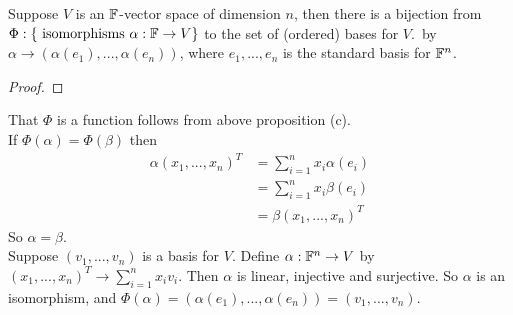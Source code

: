 \documentclass[a4paper]{article}
\begin{document}
\begin{prop}
Suppose $V$ is an $\mathbb{F}$-vector space of dimension $n$, then there is a bijection from $\Phi:\left\{\text{ isomorphisms }\alpha: \mathbb{F} \to V\right\}$ to the set of (ordered) bases for $V$.\ by $\alpha \to \left(\alpha\left(e_1\right),...,\alpha\left(e_n\right)\right)$, where $e_1,...,e_n$ is the standard basis for $\mathbb{F}^n$.
\begin{proof}
\end{proof}
That $\Phi$ is a function follows from above proposition (c).\\
If $\Phi\left(\alpha\right) = \Phi\left(\beta\right)$ then
\begin{equation*}
\begin{aligned}
\alpha \left(x_1,...,x_n\right)^T &= \sum_{i=1}^n x_i \alpha\left(e_i\right)\\
&= \sum_{i=1}^n x_i \beta\left(e_i\right)\\
&= \beta \left(x_1,...,x_n\right)^T
\end{aligned}
\end{equation*}
So $\alpha = \beta$.\\
Suppose $\left(v_1,...,v_n\right)$ is a basis for $V$. Define $\alpha:\mathbb{F}^n \to V$ by $\left(x_1,...,x_n\right)^T \to \sum_{i=1}^n x_i v_i$. Then $\alpha$ is linear, injective and surjective. So $\alpha$ is an isomorphism, and $\Phi\left(\alpha\right) = \left(\alpha\left(e_1\right),...,\alpha\left(e_n\right)\right) = \left(v_1,...,v_n\right)$.
\end{prop}
\end{document}

